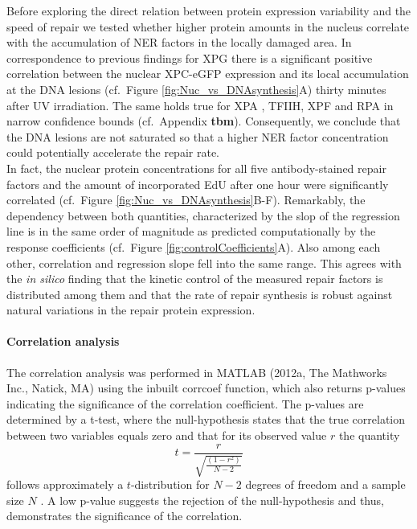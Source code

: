 Before exploring the direct relation between protein expression variability and the speed of repair we tested whether higher protein amounts in the nucleus correlate with the accumulation of NER factors in the locally damaged area. In correspondence to previous findings for XPG \cite{Luijsterburg2010} there is a significant positive correlation between the nuclear XPC-eGFP expression and its local accumulation at the DNA lesions (cf.\ Figure \ref{fig:Nuc_vs_DNAsynthesis}A) thirty minutes after UV irradiation. The same holds true for XPA \cite{Verbruggen2014}, TFIIH, XPF and RPA in narrow confidence bounds (cf.\ Appendix \textbf{tbm}). Consequently, we conclude that the DNA lesions are not saturated so that a higher NER factor concentration could potentially accelerate the repair rate.\\
In fact, the nuclear protein concentrations for all five antibody-stained repair factors and the amount of incorporated EdU after one hour were significantly correlated (cf.\ Figure \ref{fig:Nuc_vs_DNAsynthesis}B-F). Remarkably, the dependency between both quantities, characterized by the slop of the regression line is in the same order of magnitude as predicted computationally by the response coefficients (cf.\ Figure \ref{fig:controlCoefficients}A). Also among each other, correlation and regression slope fell into the same range. This agrees with the \textit{in silico} finding that the kinetic control of the measured repair factors is distributed among them and that the rate of repair synthesis is robust against natural variations in the repair protein expression.       

\paragraph{Correlation analysis}
The correlation analysis was performed in MATLAB (2012a, The Mathworks Inc., Natick, MA) using the inbuilt corrcoef function, which also returns p-values indicating the significance of the correlation coefficient. The p-values are determined by a t-test, where the null-hypothesis states that the true correlation between two variables equals zero and that for its observed value $r$ the quantity 
\begin{equation}
	t = \frac{r}{\sqrt{\frac{(1-r^2)}{N-2}}}
\end{equation}     
follows approximately a $t$-distribution for $N-2$ degrees of freedom and a sample size $N$ \cite{Kendall1979,Fisher1958}. A low p-value suggests the rejection of the null-hypothesis and thus, demonstrates the significance of the correlation.     

